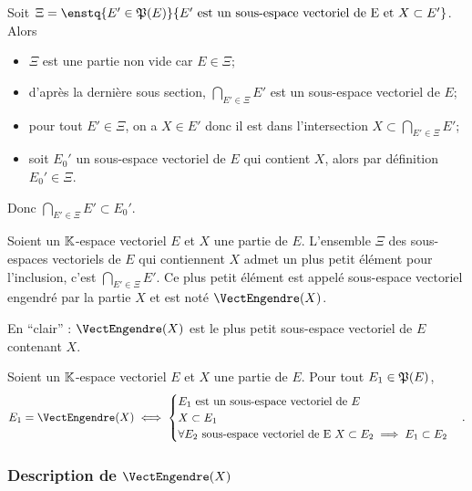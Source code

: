 Soit $\Xi=\enstq{E' \in \Part(E)}{E' \text{~est un sous-espace vectoriel de E et } X \subset E'}$. Alors
\begin{itemize}
\item $\Xi$ est une partie non vide car $E \in \Xi$;
\item d'après la dernière sous section, $\bigcap_{E' \in \Xi} E'$ est un sous-espace vectoriel de $E$;
\item pour tout $E' \in \Xi$, on a $X \in E'$ donc il est dans l'intersection $X \subset \bigcap_{E' \in \Xi} E'$;
\item soit $E_0'$ un sous-espace vectoriel de $E$ qui contient $X$, alors par définition $E_0' \in \Xi$.
\end{itemize}

Donc $\bigcap_{E' \in \Xi} E' \subset E_0'$.

\begin{defdef}
  Soient un $\mathbb{K}$-espace vectoriel $E$ et $X$ une partie de $E$. L'ensemble $\Xi$ des sous-espaces vectoriels de $E$ qui contiennent $X$ admet un plus petit élément pour l'inclusion, c'est $\bigcap_{E' \in \Xi} E'$. Ce plus petit élément est appelé sous-espace vectoriel engendré par la partie $X$ et est noté $\VectEngendre(X)$.

  En ``clair'' : $\VectEngendre(X)$ est le plus petit sous-espace vectoriel de $E$ contenant $X$.
\end{defdef}

\begin{prop}
  Soient un $\mathbb{K}$-espace vectoriel $E$ et $X$ une partie de $E$. Pour tout $E_1 \in \mathfrak{P}(E)$,
  \begin{equation}
    E_1 = \VectEngendre(X) \iff 
    \begin{cases} 
      E_1 \text{~est un sous-espace vectoriel de } E \\ 
      X \subset E_1 \\ 
      \forall E_2 \text{~sous-espace vectoriel de E } X \subset E_2 \implies E_1 \subset E_2 
    \end{cases}.
  \end{equation}
\end{prop}

\subsubsection{Description de $\VectEngendre(X)$}

